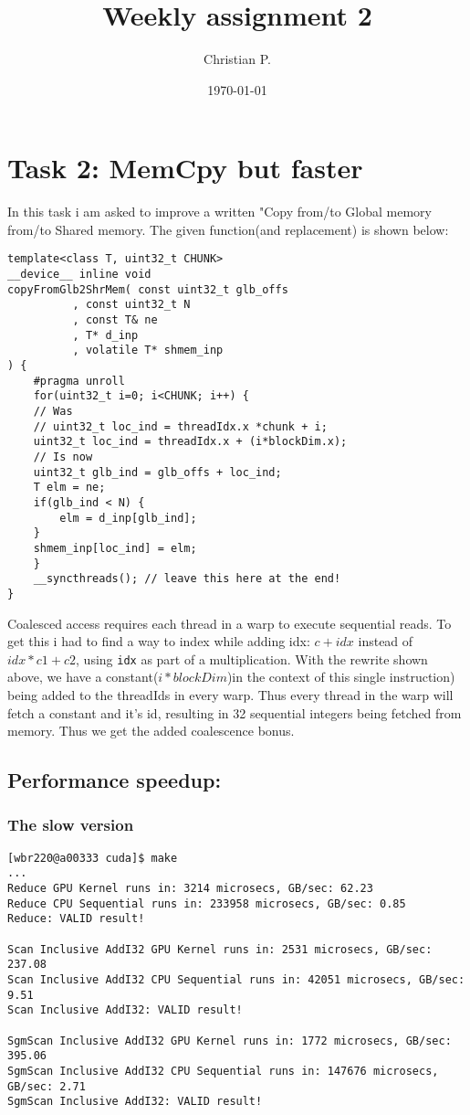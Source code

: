 \documentclass[11pt]{article}
\author{Christian P.}
\date{\today}
\title{Weekly assignment 2}
\begin{document}
\maketitle
\tableofcontents

\section{Task 2: MemCpy but faster}
\label{sec:org791fe0c}
In this task i am asked to improve a written "Copy from/to Global memory from/to Shared memory.  
The given function(and replacement) is shown below:
\begin{verbatim}
template<class T, uint32_t CHUNK>
__device__ inline void
copyFromGlb2ShrMem( const uint32_t glb_offs
		  , const uint32_t N
		  , const T& ne
		  , T* d_inp
		  , volatile T* shmem_inp
) {
    #pragma unroll
    for(uint32_t i=0; i<CHUNK; i++) {
	// Was 
	// uint32_t loc_ind = threadIdx.x *chunk + i;
	uint32_t loc_ind = threadIdx.x + (i*blockDim.x);
	// Is now
	uint32_t glb_ind = glb_offs + loc_ind;
	T elm = ne;
	if(glb_ind < N) { 
	    elm = d_inp[glb_ind];
	}
	shmem_inp[loc_ind] = elm;
    }
    __syncthreads(); // leave this here at the end!
}
\end{verbatim}
Coalesced access requires each thread in a warp to execute sequential reads.
To get this i had to find a way to index while adding idx: \(c + idx\) instead of 
\(idx * c1 + c2\), using \texttt{idx} as part of a multiplication. With the rewrite
shown above, we have a constant(\(i*blockDim\))in the context of this single instruction) 
being added to the threadIds in every warp. Thus every thread in the warp will fetch
a constant and it's id, resulting in 32 sequential integers being fetched from
memory. Thus we get the added coalescence bonus.
\subsection{Performance speedup:}
\label{sec:orgb230591}
\subsubsection{The slow version}
\label{sec:orgc39250c}
\begin{verbatim}
[wbr220@a00333 cuda]$ make
...
Reduce GPU Kernel runs in: 3214 microsecs, GB/sec: 62.23
Reduce CPU Sequential runs in: 233958 microsecs, GB/sec: 0.85
Reduce: VALID result!

Scan Inclusive AddI32 GPU Kernel runs in: 2531 microsecs, GB/sec: 237.08
Scan Inclusive AddI32 CPU Sequential runs in: 42051 microsecs, GB/sec: 9.51
Scan Inclusive AddI32: VALID result!

SgmScan Inclusive AddI32 GPU Kernel runs in: 1772 microsecs, GB/sec: 395.06
SgmScan Inclusive AddI32 CPU Sequential runs in: 147676 microsecs, GB/sec: 2.71
SgmScan Inclusive AddI32: VALID result!
\end{verbatim}
\end{document}
